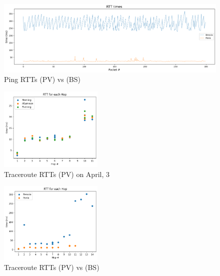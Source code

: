 \documentclass[a4paper,10pt]{article}
\begin{document}
        \begin{figure}[H]
                \centering
                \includegraphics[width=1\textwidth]{Ping_BSvsPV.png}
                \caption{\small Ping RTTs (PV) vs (BS)}
                \label{fig:ping_BSvsPV}
        \end{figure}

\begin{multicols}{2}


        \begin{figure}[H]
                \centering
                \includegraphics[width=0.44\textwidth]{scatter_april_3.png}
                \caption{\small Traceroute RTTs (PV) on April, 3}
                \label{fig:Scatter_april_3}
        \end{figure}

        \begin{figure}[H]
                \centering
                \includegraphics[width=0.44\textwidth]{Traceroute_BS_PV.png}
                \caption{\small Traceroute RTTs (PV) vs (BS)}
                \label{fig:trace_BSvsPV}
        \end{figure}



\end{multicols}
\end{document}
